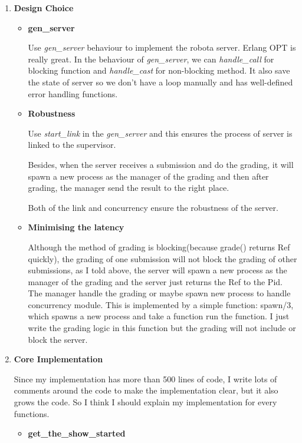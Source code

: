 \documentclass[11pt]{article}
\begin{document}
\begin{enumerate}
\item \textbf{Design Choice}

\begin{itemize}
\item \textbf{gen\_server}

Use \textit{gen\_server} behaviour to implement the robota server. Erlang OPT is really great. In the behaviour of \textit{gen\_server}, we can \textit{handle\_call} for blocking function and \textit{handle\_cast} for non-blocking method. It also save the state of server so we don't have a loop manually and has well-defined error handling functions. 

\item \textbf{Robustness} 

Use \textit{start\_link} in the \textit{gen\_server} and this ensures the process of server is linked to the supervisor.

Besides, when the server receives a submission and do the grading, it will spawn a new process as the manager of the grading and then after grading, the manager send the result to the right place.

Both of the link and concurrency ensure the robustness of the server.

\item \textbf{Minimising the latency}

Although the method of grading is blocking(because grade() returns Ref quickly), the grading of one submission will not block the grading of other submissions, as I told above, the server will spawn a new process as the manager of the grading and the server just returns the Ref to the Pid. The manager handle the grading or maybe spawn new process to handle concurrency module. This is implemented by a simple function: spawn/3, which spawns a new process and take a function run the function. I just write the grading logic in this function but the grading will not include or block the server.  
 
\end{itemize}

\item \textbf{Core Implementation}

Since my implementation has more than 500 lines of code, I write lots of comments around the code to make the implementation clear, but it also grows the code. So I think I should explain my implementation for every functions.

\begin{itemize}
\item \textbf{get\_the\_show\_started} 


\end{itemize}
\end{enumerate}
\end{document}
